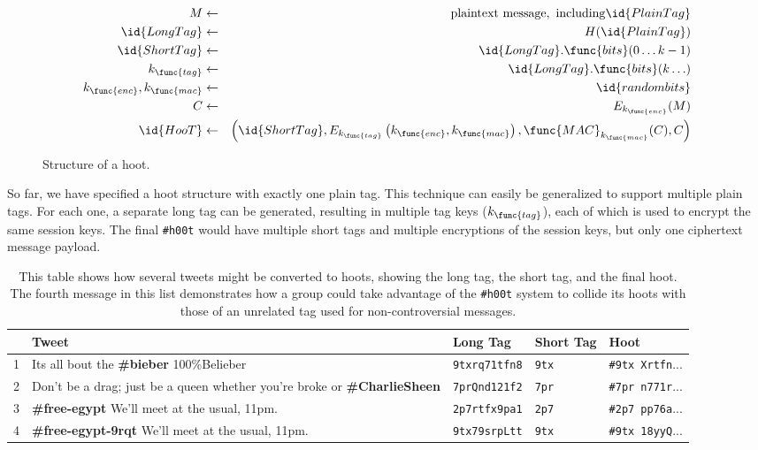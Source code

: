 \documentclass{sig-alternate-arxiv}
\newcommand{\hoot}{{\tt \#h00t}\xspace}
\newcommand{\msg}{hoot\xspace}
\newcommand{\msgs}{hoots\xspace}
\begin{document}
\begin{figure}
\begin{eqnarray*}
M & \leftarrow & \mathrm{plaintext\ message,\ including} \id{PlainTag}
\\
\id{LongTag} & \leftarrow & H(\id{PlainTag}) \\
\id{ShortTag} & \leftarrow & \id{LongTag}.\func{bits}(0 \ldots k-1) \\
k_{\func{tag}} & \leftarrow & \id{LongTag}.\func{bits}(k \ldots) \\
k_{\func{enc}}, k_{\func{mac}} & \leftarrow & \id{random bits} \\
C & \leftarrow & E_{k_{\func{enc}}}(M) \\
\id{HooT}  & \leftarrow &  \left(\id{ShortTag}, E_{k_{\func{tag}}}\left(k_{\func{enc}}, k_{\func{mac}}\right), \func{MAC}_{k_{\func{mac}}}(C), C\right)
\end{eqnarray*}
\caption{Structure of a \msg.\label{fig:hoot-structure}}
\end{figure}
%

So far, we have specified a \msg structure with exactly one plain tag.
This technique can easily be generalized to support multiple plain tags. For
each one, a separate long tag can be generated, resulting in multiple
tag keys ($k_{\func{tag}}$), each of which is used to encrypt the same
session keys. The final \hoot would have multiple short tags and multiple
encryptions of the session keys, but only one ciphertext message
payload.

\begin{table}
\caption{This table shows how several tweets might be converted to
  \msgs, showing the long tag, the short tag, and the final \msg. The
  fourth message in this list demonstrates how a group could take
  advantage of the \hoot system to collide its \msgs with those of an
  unrelated tag used for non-controversial messages.
\label{tab:process}
}
\begin{center}
    \begin{tabular}{ l  l  l  l  l }
	 & Tweet & Long Tag & Short Tag & Hoot \\ \hline
	1 & Its all bout the {\bf \#bieber} 100\%Belieber                                 & {\tt 9txrq71tfn8} &  {\tt 9tx} & {\tt \#9tx Xrtfn}... \\
	2 & Don't be a drag; just be a queen whether you're broke or {\bf \#CharlieSheen} & {\tt 7prQnd121f2} & {\tt 7pr} & {\tt \#7pr n771r}... \\
	3 & {\bf \#free-egypt} We'll meet at the usual, 11pm.                             & {\tt 2p7rtfx9pa1} & {\tt 2p7} & {\tt \#2p7 pp76a}... \\
	4 & {\bf \#free-egypt-9rqt} We'll meet at the usual, 11pm.                        & {\tt 9tx79srpLtt} &  {\tt 9tx}  & {\tt \#9tx 18yyQ}... \\
    \end{tabular}
\end{center}
\end{table}
\end{document}
